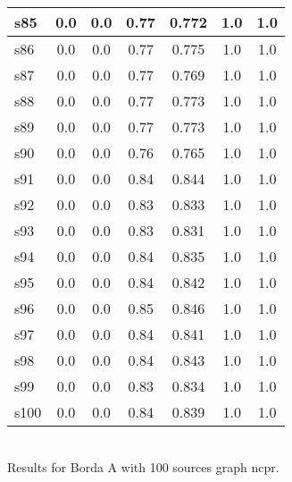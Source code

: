 \documentclass{article}
\begin{document}
\begin{tabular}{|l|c|c|c|c|c|c|}
\hline
s85 &0.0 & 0.0 & 0.77 & 0.772 & 1.0 & 1.0\\
\hline
s86 &0.0 & 0.0 & 0.77 & 0.775 & 1.0 & 1.0\\
\hline
s87 &0.0 & 0.0 & 0.77 & 0.769 & 1.0 & 1.0\\
\hline
s88 &0.0 & 0.0 & 0.77 & 0.773 & 1.0 & 1.0\\
\hline
s89 &0.0 & 0.0 & 0.77 & 0.773 & 1.0 & 1.0\\
\hline
s90 &0.0 & 0.0 & 0.76 & 0.765 & 1.0 & 1.0\\
\hline
s91 &0.0 & 0.0 & 0.84 & 0.844 & 1.0 & 1.0\\
\hline
s92 &0.0 & 0.0 & 0.83 & 0.833 & 1.0 & 1.0\\
\hline
s93 &0.0 & 0.0 & 0.83 & 0.831 & 1.0 & 1.0\\
\hline
s94 &0.0 & 0.0 & 0.84 & 0.835 & 1.0 & 1.0\\
\hline
s95 &0.0 & 0.0 & 0.84 & 0.842 & 1.0 & 1.0\\
\hline
s96 &0.0 & 0.0 & 0.85 & 0.846 & 1.0 & 1.0\\
\hline
s97 &0.0 & 0.0 & 0.84 & 0.841 & 1.0 & 1.0\\
\hline
s98 &0.0 & 0.0 & 0.84 & 0.843 & 1.0 & 1.0\\
\hline
s99 &0.0 & 0.0 & 0.83 & 0.834 & 1.0 & 1.0\\
\hline
s100 &0.0 & 0.0 & 0.84 & 0.839 & 1.0 & 1.0\\
\hline
\end{tabular}\\

\noindent Results for Borda A with 100 sources graph ncpr.
\end{document}
